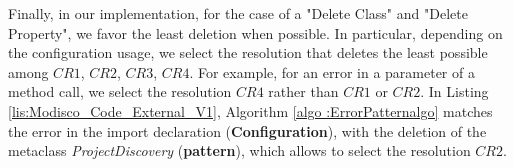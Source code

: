 %
Finally, in our implementation, for the case of a "Delete Class" and "Delete Property", we favor the least deletion when possible. In particular, depending on the configuration usage, we select the resolution that deletes the least possible among $CR1$, $CR2$, $CR3$, $CR4$. For example, for an error in a parameter of a method call, we select the resolution $CR4$ rather than $CR1$ or $CR2$. 
In Listing \ref{lis:Modisco_Code_External_V1}, Algorithm \ref{algo :ErrorPatternalgo} matches the error in the import declaration (\textbf{Configuration}), with the deletion of the metaclass \textit{ProjectDiscovery} (\textbf{pattern}), which allows to select the resolution $CR2$.







